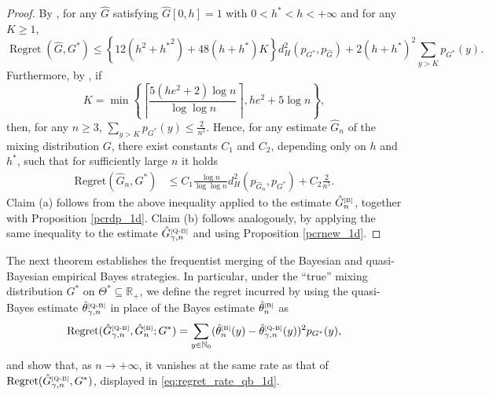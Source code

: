 \documentclass[twoside,12pt]{article}
\begin{document}
\begin{proof} By \citet[Lemma 4]{Jan(24)}, for any $\hat G$ satisfying   $\hat G[0,h]=1$ with $0<h^\ast<h<+\infty$ and for any $K\geq 1$,
\begin{displaymath}
   \operatorname{Regret}(\widehat G,G^\ast)\leq \left\{12(h^2+{h^\ast}^2)+48(h+h^\ast)K\right\}d_H^2(p_{G^\ast},p_{\hat G})+2(h+h^\ast)^2\sum_{y>K} p_{G^*}(y).
\end{displaymath}
Furthermore, by \citet[ Lemma 11]{Jan(24)}, if 
$$
K=\min\left\{\left\lceil \frac{5(he^2+2)\log n}{\log\log n}\right\rceil,he^2+5\log n\right\},
$$
then, for any $n\geq 3$,  $\sum_{y>K} p_{G^\ast}(y)\leq \frac{2}{n^5}$. Hence, for any estimate $\hat G_n$ of the mixing distribution $G$,  there exist constants $C_1$ and $C_2$, depending only on $h$ and $h^\ast$, such that for sufficiently large $n$ it holds
\begin{align*}
  \text{Regret}(\hat G_n,G^\ast)&\leq C_1\frac{\log n}{\log\log n} d_H^2(p_{\hat G_n},p_{G^*})+C_2\frac{2}{n^5}.
\end{align*}
Claim (a) follows from the above inequality applied to the estimate
$\hat G_n^{\text{\tiny{[B]}}}$, together with Proposition
\ref{pcrdp_1d}. Claim (b) follows analogously, by applying the same
inequality to the estimate $\hat G_{\gamma,n}^{\text{\tiny{[Q-B]}}}$ and using
Proposition \ref{pcrnew_1d}.
\end{proof}

The next theorem establishes the frequentist merging of the Bayesian and quasi-Bayesian empirical Bayes strategies. In particular, under the ``true'' mixing distribution $G^{\ast}$ on $\Theta^{\ast}\subseteq\mathbb R_+$, we define the regret incurred by using the quasi-Bayes estimate $\hat\theta_{\gamma,n}^{\text{\tiny{[Q-B]}}}$ in place of the Bayes estimate $\hat\theta_{n}^{\text{\tiny{[B]}}}$ as
\begin{equation}\label{merging_regret_1d}
\text{Regret}(\hat G_{\gamma,n}^{\text{\tiny{[Q-B]}}},\hat G_{n}^{\text{\tiny{[B]}}};G^{\ast})=\sum_{y\in\mathbb N_0} (\hat\theta_{n}^{\text{\tiny{[B]}}}(y)-\hat\theta_{\gamma,n}^{\text{\tiny{[Q-B]}}}(y))^2p_{G^*}(y),
\end{equation}
and show that, as $n\rightarrow+\infty$, it vanishes at the same rate as that of $\text{Regret}(\hat G_{\gamma,n}^{\text{\tiny{[Q-B]}}},G^{\ast})$, displayed in \eqref{eq:regret_rate_qb_1d}.
\end{document}
